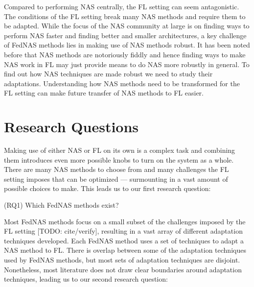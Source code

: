 Compared to performing NAS centrally, the FL setting can seem antagonistic. The conditions of the FL setting break many NAS methods and require them to be adapted. While the focus of the NAS community at large is on finding ways to perform NAS faster and finding better and smaller architectures, a key challenge of FedNAS methods lies in making use of NAS methods robust. It has been noted before that NAS methods are notoriously fiddly and hence finding ways to make NAS work in FL may just provide means to do NAS more robustly in general. To find out how NAS techniques are made robust we need to study their adaptations. Understanding how NAS methods need to be transformed for the FL setting can make future transfer of NAS methods to FL easier.



\section{Research Questions}


Making use of either NAS or FL on its own is a complex task and combining them introduces even more possible knobs to turn on the system as a whole. There are many NAS methods to choose from and many challenges the FL setting imposes that can be optimized — surmounting in a vast amount of possible choices to make. This leads us to our first research question:

\vspace{1em}
(RQ1) Which FedNAS methods exist? 
\vspace{1em}

Most FedNAS methods focus on a small subset of the challenges imposed by the FL setting [TODO: cite/verify], resulting in a vast array of different adaptation techniques developed. Each FedNAS method uses a set of techniques to adapt a NAS method to FL. There is overlap between some of the adaptation techniques used by FedNAS methods, but most sets of adaptation techniques are disjoint. Nonetheless, most literature does not draw clear boundaries around adaptation techniques, leading us to our second research question:

